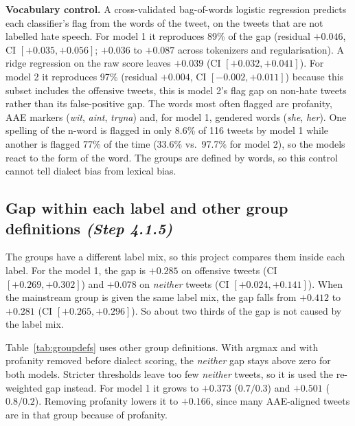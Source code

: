 \documentclass[runningheads,a4paper,oribibl]{llncs}
\begin{document}
\textbf{Vocabulary control.} A cross-validated bag-of-words logistic regression predicts each
classifier's flag from the words of the tweet, on the tweets that are not labelled hate speech.
For model 1 it reproduces 89\% of the gap (residual $+0.046$, CI $[+0.035,+0.056]$; $+0.036$ to $+0.087$ across tokenizers and
regularisation). A ridge regression on the raw score leaves $+0.039$ (CI $[+0.032,+0.041]$).
For model 2 it reproduces 97\% (residual $+0.004$, CI $[-0.002,+0.011]$) because this subset
includes the offensive tweets, this is model 2's flag gap on non-hate tweets rather than its
false-positive gap. The words most often flagged are profanity, AAE markers (\emph{wit},
\emph{aint}, \emph{tryna}) and, for model 1, gendered words (\emph{she}, \emph{her}). One
spelling of the n-word is flagged in only 8.6\% of 116 tweets by model 1 while another is
flagged 77\% of the time (33.6\% vs.\ 97.7\% for model 2), so the models react to the form of
the word.  The groups are defined by words, so this control cannot tell dialect bias from
lexical bias.

\subsection{Gap within each label and other group definitions \emph{(Step 4.1.5)}}\label{sec:groupdefs}
The groups have a different label mix, so this project compares them inside each label. For the model 1,
the gap is $+0.285$ on offensive tweets (CI $[+0.269,+0.302]$) and $+0.078$ on \emph{neither}
tweets (CI $[+0.024,+0.141]$). When the mainstream group is given the same label mix, the gap
falls from $+0.412$ to $+0.281$ (CI $[+0.265,+0.296]$). So about two thirds of the gap is not
caused by the label mix.

Table~\ref{tab:groupdefs} uses other group definitions. With argmax and with profanity removed
before dialect scoring, the \emph{neither} gap stays above zero for both models. Stricter
thresholds leave too few \emph{neither} tweets, so it is used the re-weighted gap instead. For model 1
it grows to $+0.373$ ($0.7/0.3$) and $+0.501$ ($0.8/0.2$). Removing profanity lowers it to
$+0.166$, since many AAE-aligned tweets are in that group because of profanity. 
\end{document}
